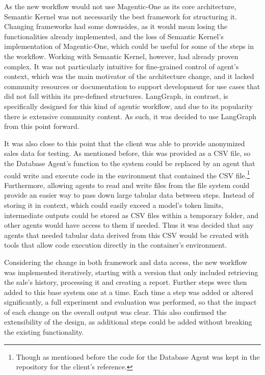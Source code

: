 \documentclass[a4paper]{report}
\begin{document}
As the new workflow would not use Magentic-One as its core architecture, Semantic Kernel was not necessarily the best framework for structuring it. Changing frameworks had some downsides, as it would mean losing the functionalities already implemented, and the loss of Semantic Kernel's implementation of Magentic-One, which could be useful for some of the steps in the workflow. Working with Semantic Kernel, however, had already proven complex. It was not particularly intuitive for fine-grained control of agent's context, which was the main motivator of the architecture change, and it lacked community resources or documentation to support development for use cases that did not fall within its pre-defined structures. LangGraph, in contrast, is specifically designed for this kind of agentic workflow, and due to its popularity there is extensive community content. As such, it was decided to use LangGraph from this point forward.

It was also close to this point that the client was able to provide anonymized sales data for testing. As mentioned before, this was provided as a CSV file, so the Database Agent's function to the system could be replaced by an agent that could write and execute code in the environment that contained the CSV file.\footnote{Though as mentioned before the code for the Database Agent was kept in the repository for the client's reference.} Furthermore, allowing agents to read and write files from the file system could provide an easier way to pass down large tabular data between steps. Instead of storing it in context, which could easily exceed a model's token limits, intermediate outputs could be stored as CSV files within a temporary folder, and other agents would have access to them if needed. Thus it was decided that any agents that needed tabular data derived from this CSV would be created with tools that allow code execution directly in the container's environment.

Considering the change in both framework and data access, the new workflow was implemented iteratively, starting with a version that only included retrieving the sale's history, processing it and creating a report. Further steps were then added to this base system one at a time. Each time a step was added or altered significantly, a full experiment and evaluation was performed, so that the impact of each change on the overall output was clear. This also confirmed the extensibility of the design, as additional steps could be added without breaking the existing functionality.
\end{document}
